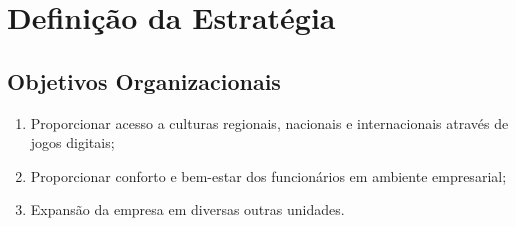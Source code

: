\documentclass{abnt}
\begin{document}
		
	\chapter {Definição da Estratégia}
		\section{Objetivos Organizacionais}
		
		\begin{enumerate}
			\item Proporcionar acesso a culturas regionais, nacionais e internacionais através de jogos digitais;
			\item Proporcionar conforto e bem-estar dos funcionários em ambiente empresarial;
			\item Expansão da empresa em diversas outras unidades.
		\end{enumerate}
\end{document}
